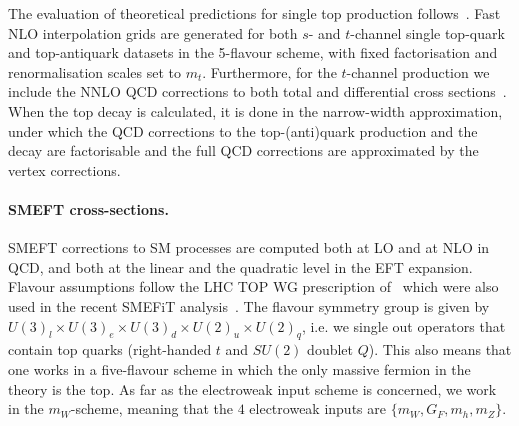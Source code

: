 \documentclass[withindex,glossary]{cam-thesis}
\begin{document}
The evaluation of theoretical predictions for single top production follows~\cite{Nocera:2019wyk}.
%
Fast NLO interpolation grids are generated for both  $s$- and $t$-channel
single top-quark and top-antiquark datasets in the 5-flavour scheme,  with fixed
factorisation and renormalisation scales set to $m_t$.
%
Furthermore, 
for the $t$-channel production we include the NNLO QCD corrections to
both total and differential cross sections~\cite{Berger:2017zof}.
%
When the top decay is calculated, it is done in the narrow-width approximation, under which the QCD corrections to the top-(anti)quark production
and the decay are factorisable and the full QCD corrections are approximated by the vertex corrections.

\paragraph{SMEFT cross-sections.}
%
SMEFT corrections to SM processes are computed both at LO and at NLO in QCD, 
and both at the linear and the quadratic level in the EFT expansion.
%
Flavour assumptions follow the LHC TOP WG prescription of~\cite{Aguilar-Saavedra:2018ksv}
which were also used in the recent {\sc\small SMEFiT} analysis~\cite{Ethier:2021bye}.
%
The flavour symmetry group is
given by $U(3)_l \times U(3)_e \times U(3)_d \times U(2)_u \times U(2)_q$, i.e. we single out operators that contain
top quarks (right-handed $t$ and $SU(2)$ doublet $Q$).
%
This also means that one works in a five-flavour scheme in which the
only massive fermion in the theory is the top.
%
As far as the electroweak input scheme is concerned, we work in the $m_W$-scheme, meaning that the $4$
electroweak inputs are
$\{m_W, G_F, m_h, m_Z\}$.
\end{document}
